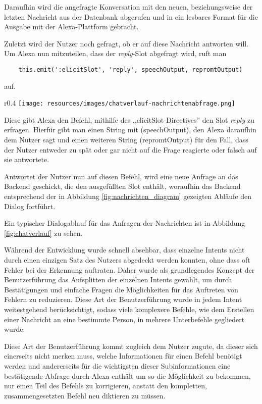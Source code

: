 Daraufhin wird die angefragte Konversation mit den neuen, beziehungsweise der letzten Nachricht aus der Datenbank abgerufen und in ein lesbares Format für die Ausgabe mit der Alexa-Plattform gebracht.

Zuletzt wird der Nutzer noch gefragt, ob er auf diese Nachricht antworten will. Um Alexa nun mitzuteilen, dass der \textit{reply}-Slot abgefragt wird, ruft man
\begin{lstlisting}
    this.emit(':elicitSlot', 'reply', speechOutput, repromtOutput)
\end{lstlisting}
auf.

\begin{wrapfigure}{r}{0.4\textwidth}
    \texttt{[image: resources/images/chatverlauf-nachrichtenabfrage.png]}
    \caption{Beispieldialog der Nachrichtenabfrage}
    \label{fig:chatverlauf}

\end{wrapfigure}
Diese gibt Alexa den Befehl, mithilfe des ,,elicitSlot-Directives'' den Slot \textit{reply} zu erfragen. Hierfür gibt man einen String mit (speechOutput), den Alexa daraufhin dem Nutzer sagt und einen weiteren String (repromtOutput) für den Fall, dass der Nutzer entweder zu spät oder gar nicht auf die Frage reagierte oder falsch auf sie antwortete.

Antwortet der Nutzer nun auf diesen Befehl, wird eine neue Anfrage an das Backend geschickt, die den ausgefüllten Slot enthält, woraufhin das Backend entsprechend der in Abbildung \ref{fig:nachrichten_diagram} gezeigten Abläufe den Dialog fortführt.

Ein typischer Dialogablauf für das Anfragen der Nachrichten ist in Abbildung \ref{fig:chatverlauf} zu sehen.

Während der Entwicklung wurde schnell absehbar, dass einzelne Intents nicht durch einen einzigen Satz des Nutzers abgedeckt werden konnten, ohne dass oft Fehler bei der Erkennung auftraten. Daher wurde als grundlegendes Konzept der Benutzerführung das Aufsplitten der einzelnen Intents gewählt, um durch Bestätigungen und einfache Fragen die Möglichkeiten für das Auftreten von Fehlern zu reduzieren. Diese Art der Benutzerführung wurde in jedem Intent weitestgehend berücksichtigt, sodass viele komplexere Befehle, wie dem Erstellen einer Nachricht an eine bestimmte Person, in mehrere Unterbefehle gegliedert wurde.

Diese Art der Benutzerführung kommt zugleich dem Nutzer zugute, da dieser sich einerseits nicht merken muss, welche Informationen für einen Befehl benötigt werden und andererseits für die wichtigsten dieser Subinformationen eine bestätigende Abfrage durch Alexa enthält um so die Möglichkeit zu bekommen, nur einen Teil des Befehls zu korrigieren, anstatt den kompletten, zusammengesetzten Befehl neu diktieren zu müssen.


